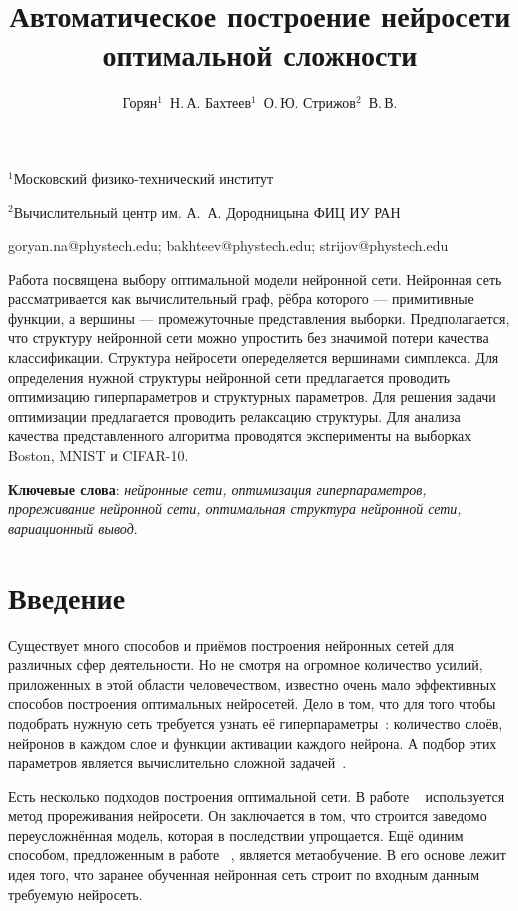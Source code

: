 \documentclass[12pt,twoside]{article}
\begin{document}
\title
    {Автоматическое построение нейросети оптимальной сложности}
\author
    {Горян$^1$~Н.\,А. Бахтеев$^1$~О.\,Ю.  Стрижов$^2$~В.\,В.} %

\organization
    {$^1$Московский физико-технический институт\par
    $^2$Вычислительный центр им. А.~А. Дородницына ФИЦ ИУ РАН}

\email
    {goryan.na@phystech.edu; bakhteev@phystech.edu; strijov@phystech.edu}    


    

\abstract
	{Работа посвящена выбору оптимальной модели нейронной сети. Нейронная сеть рассматривается как вычислительный граф, рёбра которого --- примитивные функции, а вершины --- промежуточные представления выборки. Предполагается, что структуру нейронной сети можно упростить без значимой потери качества классификации. Структура нейросети опеределяется вершинами симплекса. Для определения нужной структуры нейронной сети предлагается проводить оптимизацию гиперпараметров и структурных параметров. Для решения задачи оптимизации предлагается проводить релаксацию структуры. Для анализа качества представленного алгоритма проводятся эксперименты на выборках Boston, MNIST и CIFAR-10.
\bigskip

\textbf{Ключевые слова}: \emph {нейронные сети, оптимизация гиперпараметров, прореживание нейронной сети, оптимальная структура нейронной сети, вариационный вывод}.
}


\maketitle


\section{ Введение}
	Существует много способов и приёмов построения нейронных сетей для различных сфер деятельности. Но не смотря на огромное количество усилий, приложенных в этой области человечеством, известно очень мало эффективных
	способов построения оптимальных нейросетей. Дело в том, что для того чтобы подобрать нужную сеть требуется узнать её гиперпараметры~\cite{Myung1997}: количество слоёв, нейронов в каждом слое и функции активации каждого нейрона. А подбор этих параметров является вычислительно сложной задачей~\cite{sutskever2014}.
	
	Есть несколько подходов построения оптимальной сети. В работе ~\cite{cun1990, graves2011} используется метод прореживания нейросети. Он заключается в том, что строится заведомо переусложнённая модель, которая в последствии упрощается. Ещё одиним способом, предложенным в работе ~\cite{Maclaurin:2015:GHO:3045118.3045343}, является метаобучение. В его основе лежит идея того, что заранее обученная нейронная сеть строит по входным данным требуемую нейросеть.
	
\end{document}

